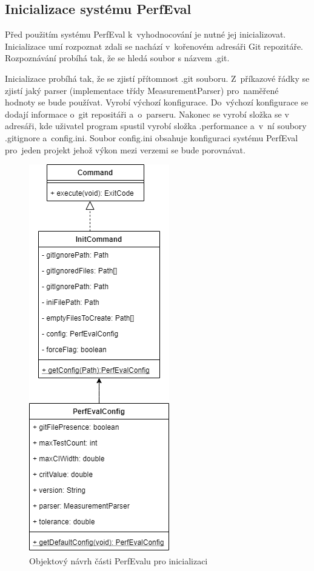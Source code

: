 \subsection{Inicializace systému PerfEval}

Před použitím systému PerfEval k~vyhodnocování je nutné jej inicializovat. Inicializace umí rozpoznat zdali se nachází
v~kořenovém adresáři Git repozitáře. Rozpoznávání probíhá tak, že se hledá soubor s názvem .git.

Inicializace probíhá tak, že se zjistí přítomnost .git souboru. Z~příkazové řádky se zjistí jaký parser (implementace
třídy MeasurementParser) pro~naměřené hodnoty se bude používat. Vyrobí výchozí konfigurace. Do~výchozí konfigurace
se dodají informace o~git repositáři a~o~parseru. Nakonec se vyrobí složka se v adresáři, kde uživatel program spustil
vyrobí složka .performance a~v~ní soubory .gitignore a~config.ini. Soubor config.ini obsahuje konfiguraci systému PerfEval
pro~jeden projekt jehož výkon mezi verzemi se bude porovnávat.

\begin{figure}[!ht]
    \centering
    \includegraphics[height=0.5\textheight]{../img/perfeval_init.png}
    \caption{Objektový návrh části PerfEvalu pro inicializaci}
\end{figure}

